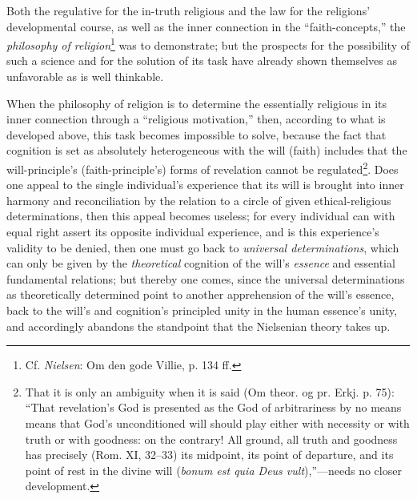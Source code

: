 \documentclass[12pt,a4paper]{book}
\begin{document}
Both the regulative for the in-truth religious and the law for the religions' developmental course, as well
as the inner connection in the ``faith-concepts,'' the \emph{philosophy of religion}\footnote{Cf. \emph{Nielsen}:
Om den gode Villie, p. 134 ff.} was to demonstrate; but the prospects for the possibility of such a science
and for the solution of its task have already shown themselves as unfavorable as is well thinkable.

When the philosophy of religion is to determine the essentially religious in its inner connection through a
``religious motivation,'' then, according to what is developed above, this task becomes impossible to solve,
because the fact that cognition is set as absolutely heterogeneous with the will (faith) includes that the
will-principle's (faith-principle's) forms of revelation cannot be regulated\footnote{That it is only an
ambiguity when it is said (Om theor. og pr. Erkj. p. 75): ``That revelation's God is presented as the God of
arbitrariness by no means means that God's unconditioned will should play either with necessity or with truth
or with goodness: on the contrary! All ground, all truth and goodness has precisely (Rom. XI, 32--33) its
midpoint, its point of departure, and its point of rest in the divine will (\textit{bonum est quia Deus vult}),''---needs
no closer development.}. Does one appeal to the single individual's experience that its will is brought into
inner harmony and reconciliation by the relation to a circle of given ethical-religious determinations, then
this appeal becomes useless; for every individual can with equal right assert its opposite individual
experience, and is this experience's validity to be denied, then one must go back to \emph{universal
determinations}, which can only be given by the \emph{theoretical} cognition of the will's \emph{essence} and
essential fundamental relations; but thereby one comes, since the universal determinations as theoretically
determined point to another apprehension of the will's essence, back to the will's and cognition's principled
unity in the human essence's unity, and accordingly abandons the standpoint that the Nielsenian theory takes up.
\end{document}
